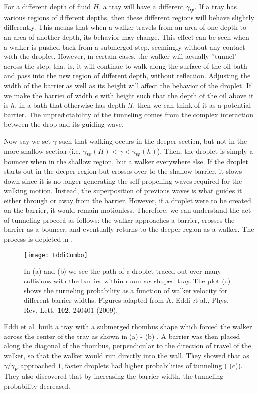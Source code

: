 For a different depth of fluid $H$, a tray will have a different $\gamma_\mathrm{W}$. If a tray has various regions of different depths, then these different regions will behave slightly differently. This means that when a walker travels from an area of one depth to an area of another depth, its behavior may change. This effect can be seen when a walker is pushed back from a submerged step, seemingly without any contact with the droplet. However, in certain cases, the walker will actually ``tunnel" across the step; that is, it will continue to walk along the surface of the oil bath and pass into the new region of different depth, without reflection. Adjusting the width of the barrier as well as its height will affect the behavior of the droplet. If we make the barrier of width $e$ with height such that the depth of the oil above it is $h$, in a bath that otherwise has depth $H$, then we can think of it as a potential barrier. The unpredictability of the tunneling comes from the complex interaction between the drop and its guiding wave. 

Now say we set $\gamma$ such that walking occurs in the deeper section, but not in the more shallow section (i.e.  $\gamma_\mathrm{W}(H)<\gamma<\gamma_\mathrm{W}(h)$). Then, the droplet is simply a bouncer when in the shallow region, but a walker everywhere else. If the droplet starts out in the deeper region but crosses over to the shallow barrier, it slows down since it is no longer generating the self-propelling waves required for the walking motion. Instead, the superposition of previous waves is what guides it either through or away from the barrier. However, if a droplet were to be created on the barrier, it would remain motionless. Therefore, we can understand the act of tunneling proceed as follows: the walker approaches a barrier, crosses the barrier as a bouncer, and eventually returns to the deeper region as a walker. The process is depicted in . 

\begin{figure}[]
  \texttt{[image: EddiCombo]}
\caption{In (a) and (b) we see the path of a droplet traced out over many collisions with the barrier within rhombus shaped tray. The plot (c) shows the tunneling probability as a function of walker velocity for different barrier widths. Figures adapted from A. Eddi et al., Phys. Rev. Lett. \textbf{102}, 240401 (2009).}
\label{fig:Eddi}
	\end{figure}

Eddi et al. built a tray with a submerged rhombus shape which forced the walker across the center of the tray as shown in  (a) - (b) . A barrier was then placed along the diagonal of the rhombus, perpendicular to the direction of travel of the walker, so that the walker would run directly into the wall. They showed that as $\gamma/\gamma_\mathrm{F}$ approached $1$, faster droplets had higher probabilities of tunneling ( (c)). They also discovered that by increasing the barrier width, the tunneling probability decreased. 

